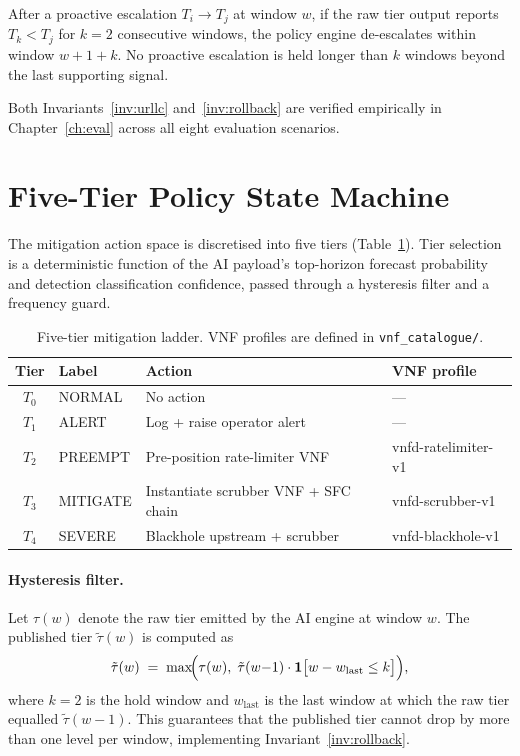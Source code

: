 \begin{invariant}
\label{inv:rollback}
After a proactive escalation $T_i \to T_j$ at window $w$, if the raw
tier output reports $T_k < T_j$ for $k{=}2$ consecutive windows, the
policy engine de-escalates within window $w + 1 + k$. No proactive
escalation is held longer than $k$ windows beyond the last supporting
signal.
\end{invariant}

Both Invariants~\ref{inv:urllc} and~\ref{inv:rollback} are verified
empirically in Chapter~\ref{ch:eval} across all eight evaluation
scenarios.

\section{Five-Tier Policy State Machine}
\label{sec:tiers}

The mitigation action space is discretised into five tiers
(Table~\ref{tab:tiers}). Tier selection is a deterministic function of
the AI payload's top-horizon forecast probability and detection
classification confidence, passed through a hysteresis filter and a
frequency guard.

\begin{table}[H]
\centering
\small
\caption{Five-tier mitigation ladder. VNF profiles are defined in
\texttt{vnf\_catalogue/}.}
\label{tab:tiers}
\begin{tabular}{@{}clll@{}}
\toprule
Tier & Label & Action & VNF profile \\
\midrule
$T_0$ & NORMAL  & No action                           & --- \\
$T_1$ & ALERT   & Log + raise operator alert           & --- \\
$T_2$ & PREEMPT & Pre-position rate-limiter VNF        & vnfd-ratelimiter-v1 \\
$T_3$ & MITIGATE& Instantiate scrubber VNF + SFC chain & vnfd-scrubber-v1 \\
$T_4$ & SEVERE  & Blackhole upstream + scrubber        & vnfd-blackhole-v1 \\
\bottomrule
\end{tabular}
\end{table}

\paragraph{Hysteresis filter.}
Let $\tau(w)$ denote the raw tier emitted by the AI engine at window $w$.
The published tier $\tilde{\tau}(w)$ is computed as
\[
  \tilde{\tau}(w) \;=\;
  \max\!\Bigl(\tau(w),\;
              \tilde{\tau}(w{-}1)
              \cdot \mathbf{1}\bigl[w - w_{\mathrm{last}} \leq k\bigr]\Bigr),
\]
where $k{=}2$ is the hold window and $w_{\mathrm{last}}$ is the last
window at which the raw tier equalled $\tilde{\tau}(w{-}1)$. This
guarantees that the published tier cannot drop by more than one level
per window, implementing Invariant~\ref{inv:rollback}.

